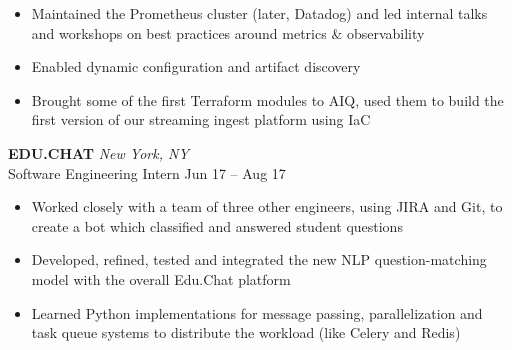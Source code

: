 \documentclass[letterpaper]{article}
\begin{document}
\begin{bgbox}[height=\paperheight, colback=white, width=0.62\textwidth]
\begin{itemize} [noitemsep,topsep=4pt]
			\item Maintained the Prometheus cluster (later, Datadog) and led internal talks and workshops on best practices around metrics \& observability
			\item Enabled dynamic configuration and artifact discovery
			\item Brought some of the first Terraform modules to AIQ, used them to build \linebreak the first version of our streaming ingest platform using IaC
		\end{itemize}
		\vspace*{12pt}
		\textbf{EDU.CHAT} \hfill \textit{New York, NY}\\
		Software Engineering Intern \hfill Jun 17 -- Aug 17
		\begin{itemize} [noitemsep,topsep=4pt]
			\item Worked closely with a team of three other engineers, using JIRA and Git, to create a bot which classified and answered student questions
			\item Developed, refined, tested and integrated the new NLP question-matching model with the overall Edu.Chat platform
			\item Learned Python implementations for message passing, parallelization and task queue systems to distribute the workload (like Celery and Redis)
		\end{itemize}
	\end{bgbox}%
\end{document}

